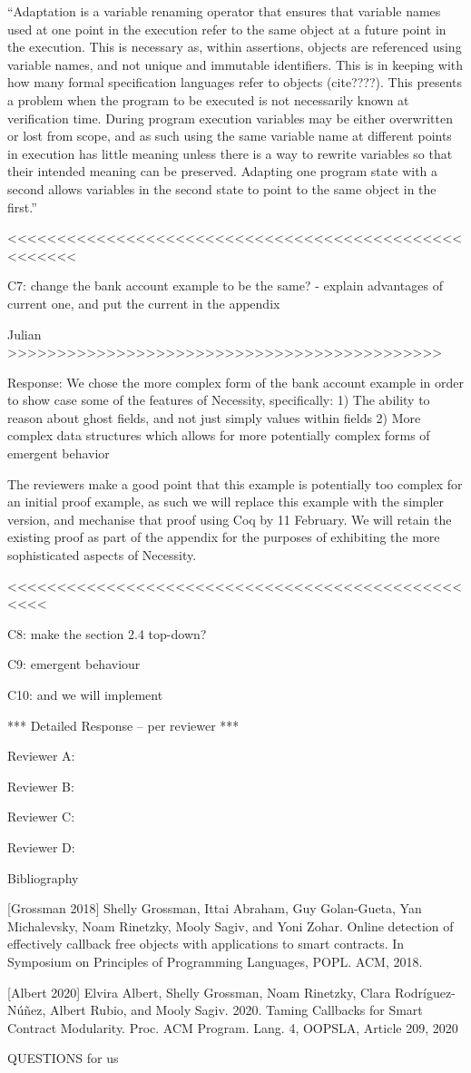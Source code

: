 ``Adaptation is a variable renaming operator that ensures that variable names used at one point in the execution refer to the same object at a future point in the execution. This is necessary as, within assertions, objects are referenced using variable names, and not unique and immutable identifiers. This is in keeping with how many formal specification languages refer to objects (cite????). This presents a problem when the program to be executed is not necessarily known at verification time. During program execution variables may be either overwritten or lost from scope, and as such using the same variable name at different points in execution has little meaning unless there is a way to rewrite variables so that their intended meaning can be preserved. Adapting one program state with a second allows variables in the second state to point to the same object in the first.''

<<<<<<<<<<<<<<<<<<<<<<<<<<<<<<<<<<<<<<<<<<<<<<<<<<<<<

C7: change the bank account example to be the same?
- explain advantages of current one, and put the current in the appendix

Julian >>>>>>>>>>>>>>>>>>>>>>>>>>>>>>>>>>>>>>>>>>>>

Response:
We chose the more complex form of the bank account example in order to show case some of the features of Necessity, specifically:
1) The ability to reason about ghost fields, and not just simply values within fields
2) More complex data structures which allows for more potentially complex forms of emergent behavior

The reviewers make a good point that this example is potentially too complex for an initial proof example, as such we will 
replace this example with the simpler version, and mechanise that proof using Coq by 11 February. We will retain the existing proof as part 
of the appendix for the purposes of exhibiting the more sophisticated aspects of Necessity.


<<<<<<<<<<<<<<<<<<<<<<<<<<<<<<<<<<<<<<<<<<<<<<<<<<

C8: make the section 2.4 top-down?

C9: emergent behaviour 

C10: and we will implement
 


*** Detailed Response -- per reviewer ***

Reviewer A:

Reviewer B:

Reviewer C:

Reviewer D:

Bibliography

[Grossman 2018] Shelly Grossman, Ittai Abraham, Guy Golan-Gueta, Yan Michalevsky, Noam Rinetzky, Mooly Sagiv, and Yoni Zohar. Online detection of effectively callback free objects with applications to smart contracts. In Symposium on Principles of Programming Languages, POPL. ACM, 2018.

[Albert 2020] Elvira Albert, Shelly Grossman, Noam Rinetzky, Clara Rodríguez-Núñez, Albert Rubio, and Mooly Sagiv. 2020. Taming Callbacks for Smart Contract Modularity. Proc. ACM Program. Lang. 4, OOPSLA, Article 209, 2020


QUESTIONS for us